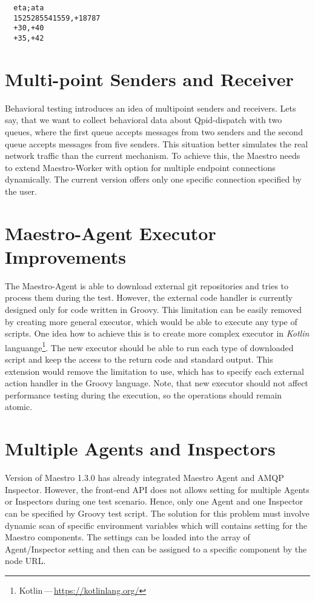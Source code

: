 \begin{verbatim}
  eta;ata
  1525285541559,+18787
  +30,+40
  +35,+42
\end{verbatim}

\section{Multi-point Senders and Receiver}
Behavioral testing introduces an idea of multipoint senders and receivers. Lets say, that we want to collect behavioral data about Qpid-dispatch with two queues, where the first queue accepts messages from two senders and the second queue accepts messages from five senders. This situation better simulates the real network traffic than the current mechanism. To achieve this, the Maestro needs to extend Maestro-Worker with option for multiple endpoint connections dynamically. The current version offers only one specific connection specified by the user.

\section{Maestro-Agent Executor Improvements}
The Maestro-Agent is able to download external git repositories and tries to process them during the test. However, the external code handler is currently designed only for code written in Groovy. This limitation can be easily removed by creating more general executor, which would be able to execute any type of scripts. One idea how to achieve this is to create more complex executor in \emph{Kotlin} languange\footnote{Kotlin\,---\,\url{https://kotlinlang.org/}}. The new executor should be able to run each type of downloaded script and keep the access to the return code and standard output. This extension would remove the limitation to use, which has to specify each external action handler in the Groovy language. Note, that new executor should not affect performance testing during the execution, so the operations should remain atomic.

\section{Multiple Agents and Inspectors}
Version of Maestro 1.3.0 has already integrated Maestro Agent and AMQP Inspector. However, the front-end API does not allows setting for multiple Agents or Inspectors during one test scenario. Hence, only one Agent and one Inspector can be specified by Groovy test script. The solution for this problem must involve dynamic scan of specific environment variables which will contains setting for the Maestro components. The settings can be loaded into the array of Agent/Inspector setting and then can be assigned to a specific component by the node URL.

